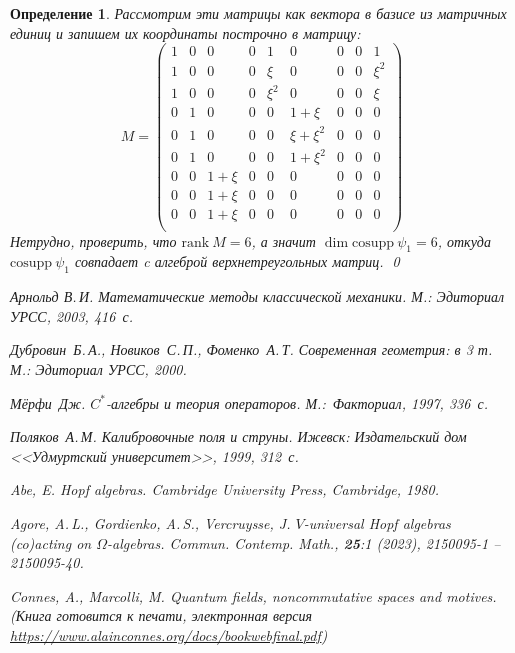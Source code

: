 \documentclass[12pt, reqno, a4paper, oneside, notitlepage]{amsart}
\makeatletter
\theoremstyle{mytheoremstyle}
\theoremstyle{myremarkstyle}
\newtheorem{definition}[theorem]{Определение}
\numberwithin{equation}{section}
\renewenvironment{proof}[1][\proofname]{\par\indent {\bfseries #1\@addpunct{.} }}{\qed}
\makeatother
\begin{document}
\begin{definition}
\begin{proof}
    Рассмотрим эти матрицы как вектора в базисе из матричных единиц и запишем их координаты построчно в матрицу: \[ M=
    \begin{pmatrix}
        1 & 0 & 0 & 0 & 1 & 0 & 0 & 0 & 1\\
        1 & 0 & 0 & 0 & \xi & 0 & 0 & 0 & \xi^2\\
        1 & 0 & 0 & 0 & \xi^2 & 0 & 0 & 0 & \xi\\
        0 & 1 & 0 & 0 & 0 & 1+\xi & 0 & 0 & 0\\
        0 & 1 & 0 & 0 & 0 & \xi+\xi^2 & 0 & 0 & 0\\
        0 & 1 & 0 & 0 & 0 & 1+\xi^2 & 0 & 0 & 0\\
        0 & 0 & 1+\xi & 0 & 0 & 0 & 0 & 0 & 0\\
        0 & 0 & 1+\xi & 0 & 0 & 0 & 0 & 0 & 0\\
        0 & 0 & 1+\xi & 0 & 0 & 0 & 0 & 0 & 0\\
    \end{pmatrix}
    \]
    Нетрудно, проверить, что $\mathrm{rank}\ M = 6$, а значит $\dim \mathrm{cosupp} \ \psi_1 = 6$, откуда $\mathrm{cosupp}\ \psi_1$ совпадает c алгеброй верхнетреугольных матриц.
\end{proof}


\newpage
\begin{thebibliography}{99}
	
\normalsize


 Арнольд В.\,И. Математические методы классической механики. М.: Эдиториал УРСС, 2003, 416~с.

Дубровин~Б.\,А., Новиков~С.\,П., Фоменко~А.\,Т. Современная геометрия: в 3 т.
М.: Эдиториал УРСС, 2000.


 Мёрфи~Дж. $C^*$-алгебры и теория операторов. М.:~Факториал, 1997, 336~с.


 Поляков~А.\,М. Калибровочные поля и струны. Ижевск: Издательский дом <<Удмуртский университет>>, 1999, 312~с.

 Abe, E. Hopf algebras. Cambridge University Press, Cambridge, 1980.

Agore, A.\,L., Gordienko, A.\,S., Vercruysse, J.
$V$-universal Hopf algebras (co)acting on $\Omega$-algebras. \textit{Commun. Contemp. Math.},
\textbf{25}:1 (2023), 2150095-1 -- 2150095-40. 

 Connes, A., Marcolli, M. Quantum fields, noncommutative spaces and motives. (Книга готовится к печати, электронная версия \url{https://www.alainconnes.org/docs/bookwebfinal.pdf})



\end{thebibliography}
\end{definition}
\end{document}
